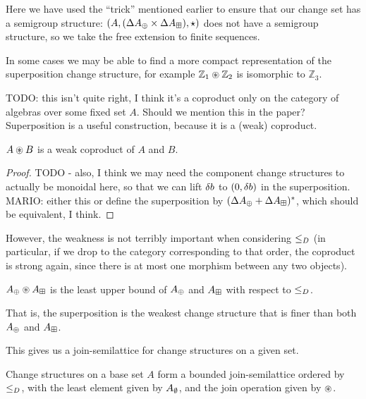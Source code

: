 Here we have used the ``trick'' mentioned earlier to ensure that our change
set has a semigroup structure: $(A,(\Delta A_\oplus \times
  \Delta A_\boxplus),\star)$ does not have a semigroup structure, so we take
the free extension to finite sequences.

In some cases we may be able to find a more compact representation of the
superposition change structure, for example $\mathbb{Z}_1 \circledast \mathbb{Z}_2$ is isomorphic to $\mathbb{Z}_3$.

TODO: this isn't quite right, I think it's a coproduct only on the category of algebras over some fixed 
set $A$. Should we mention this in the paper?
Superposition is a useful construction, because it is a (weak) coproduct.

\begin{prop}
  $A \circledast B$ is a weak coproduct of $A$ and $B$.
\end{prop}
\begin{proof}
  TODO - also, I think we may need the component change structures to actually
  be monoidal here, so that we can lift $\delta b$ to $(0, \delta b)$ in
  the superposition.
  MARIO: either this or define the superposition by $(\Delta A_\oplus + \Delta A_\boxplus)^\ast$,
  which should be equivalent, I think.
\end{proof}

However, the weakness is not terribly important when considering $\leq_D$
(in particular, if we drop to the category corresponding to that order, the
coproduct is strong again, since there is at most one morphism between any two
objects). 

\begin{corollary}
  $A_\oplus \circledast A_\boxplus$ is the least upper bound of $A_\oplus$ and $A_\boxplus$ with respect to $\leq_D$.
\end{corollary}

That is, the superposition is the weakest change structure that is finer than both
$A_\oplus$ and $A_\boxplus$.

This gives us a join-semilattice for change structures on a given set.

\begin{thm}
  Change structures on a base set $A$ form a bounded join-semilattice 
  ordered by $\leq_D$, with the least element given by
  $A_\emptyset$, and the join operation given by $\circledast$.
\end{thm}


